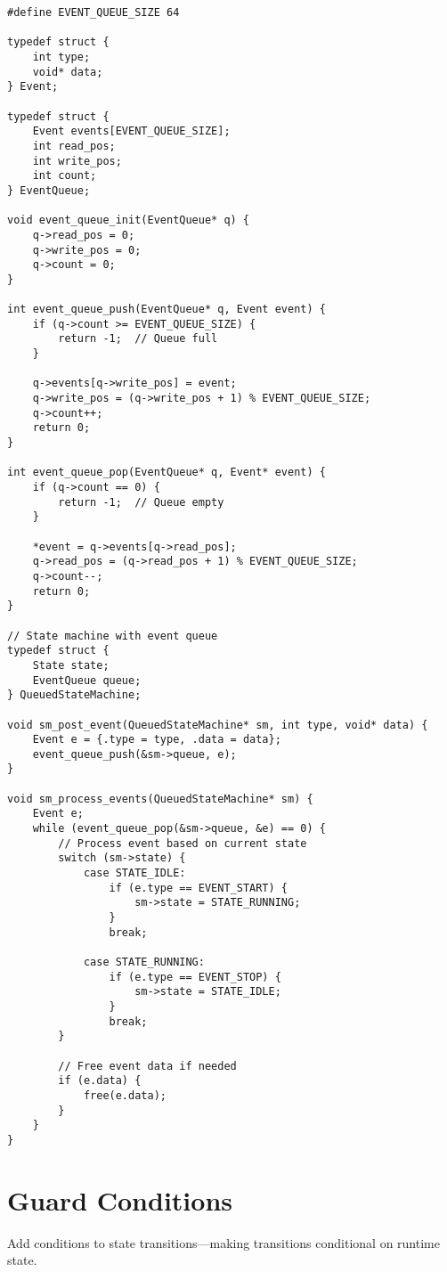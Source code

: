 \begin{lstlisting}
#define EVENT_QUEUE_SIZE 64

typedef struct {
    int type;
    void* data;
} Event;

typedef struct {
    Event events[EVENT_QUEUE_SIZE];
    int read_pos;
    int write_pos;
    int count;
} EventQueue;

void event_queue_init(EventQueue* q) {
    q->read_pos = 0;
    q->write_pos = 0;
    q->count = 0;
}

int event_queue_push(EventQueue* q, Event event) {
    if (q->count >= EVENT_QUEUE_SIZE) {
        return -1;  // Queue full
    }

    q->events[q->write_pos] = event;
    q->write_pos = (q->write_pos + 1) % EVENT_QUEUE_SIZE;
    q->count++;
    return 0;
}

int event_queue_pop(EventQueue* q, Event* event) {
    if (q->count == 0) {
        return -1;  // Queue empty
    }

    *event = q->events[q->read_pos];
    q->read_pos = (q->read_pos + 1) % EVENT_QUEUE_SIZE;
    q->count--;
    return 0;
}

// State machine with event queue
typedef struct {
    State state;
    EventQueue queue;
} QueuedStateMachine;

void sm_post_event(QueuedStateMachine* sm, int type, void* data) {
    Event e = {.type = type, .data = data};
    event_queue_push(&sm->queue, e);
}

void sm_process_events(QueuedStateMachine* sm) {
    Event e;
    while (event_queue_pop(&sm->queue, &e) == 0) {
        // Process event based on current state
        switch (sm->state) {
            case STATE_IDLE:
                if (e.type == EVENT_START) {
                    sm->state = STATE_RUNNING;
                }
                break;

            case STATE_RUNNING:
                if (e.type == EVENT_STOP) {
                    sm->state = STATE_IDLE;
                }
                break;
        }

        // Free event data if needed
        if (e.data) {
            free(e.data);
        }
    }
}
\end{lstlisting}

\section{Guard Conditions}

Add conditions to state transitions---making transitions conditional on runtime state.


